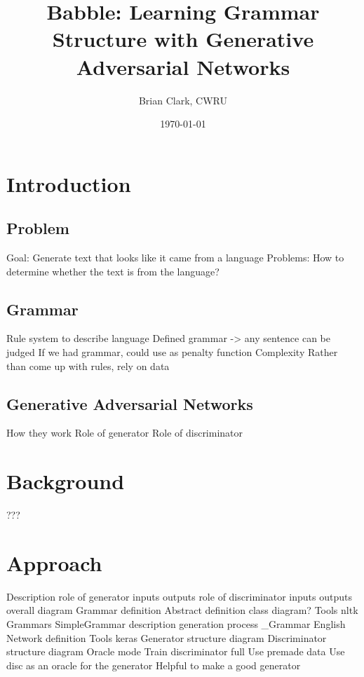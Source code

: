 \documentclass{article}
\title{Babble: Learning Grammar Structure with Generative Adversarial Networks}
\author{Brian Clark, CWRU}
\date{\today}
\begin{document}
\maketitle
\tableofcontents


\section{Introduction}

\subsection{Problem}
Goal: Generate text that looks like it came from a language
Problems: How to determine whether the text is from the language?

\subsection{Grammar}
    Rule system to describe language
    Defined grammar -> any sentence can be judged
    If we had grammar, could use as penalty function
    Complexity
    Rather than come up with rules, rely on data

\subsection{Generative Adversarial Networks}
    How they work
    Role of generator
    Role of discriminator

\section{Background}
    ???

\section{Approach}
    Description
        role of generator
            inputs
            outputs
        role of discriminator
            inputs
            outputs
        overall diagram
    Grammar definition
        Abstract definition
            class diagram?
        Tools
            nltk
        Grammars
            SimpleGrammar
                description
                generation process
            \_Grammar
            English
    Network definition
        Tools
            keras
        Generator structure
            diagram
        Discriminator structure
            diagram
    Oracle mode
        Train discriminator full
        Use premade data
        Use disc as an oracle for the generator
        Helpful to make a good generator
\end{document}
